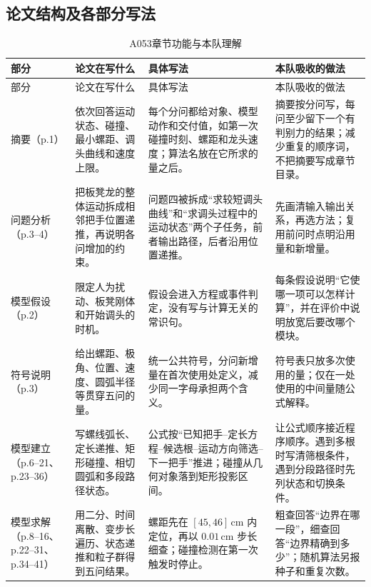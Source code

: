 \subsection{论文结构及各部分写法}

\small
\begin{longtable}{p{2.25cm}p{4.0cm}p{5.1cm}p{4.2cm}}
\caption{A053章节功能与本队理解}\label{tab:a053-structure}\\
\toprule
部分 & 论文在写什么 & 具体写法 & 本队吸收的做法\\
\midrule
\endfirsthead
\toprule
部分 & 论文在写什么 & 具体写法 & 本队吸收的做法\\
\midrule
\endhead
\bottomrule
\endfoot
摘要（p.1）
& 依次回答运动状态、碰撞、最小螺距、调头曲线和速度上限。
& 每个分问都给对象、模型动作和交付值，如第一次碰撞时刻、螺距和龙头速度；算法名放在它所求的量之后。
& 摘要按分问写，每问至少留下一个有判别力的结果；减少重复的顺序词，不把摘要写成章节目录。\\

问题分析（p.3--4）
& 把板凳龙的整体运动拆成相邻把手位置递推，再说明各问增加的约束。
& 问题四被拆成“求较短调头曲线”和“求调头过程中的运动状态”两个子任务，前者输出路径，后者沿用位置递推。
& 先画清输入输出关系，再选方法；复用前问时点明沿用量和新增量。\\

模型假设（p.2）
& 限定人为扰动、板凳刚体和开始调头的时机。
& 假设会进入方程或事件判定，没有写与计算无关的常识句。
& 每条假设说明“它使哪一项可以怎样计算”，并在评价中说明放宽后要改哪个模块。\\

符号说明（p.3）
& 给出螺距、极角、位置、速度、圆弧半径等贯穿五问的量。
& 统一公共符号，分问新增量在首次使用处定义，减少同一字母承担两个含义。
& 符号表只放多次使用的量；仅在一处使用的中间量随公式解释。\\

模型建立（p.6--21、p.23--36）
& 写螺线弧长、定长递推、矩形碰撞、相切圆弧和多段路径状态。
& 公式按“已知把手--定长方程--候选根--运动方向筛选--下一把手”推进；碰撞从几何对象落到矩形投影区间。
& 让公式顺序接近程序顺序。遇到多根时写清筛根条件，遇到分段路径时先列状态和切换条件。\\

模型求解（p.8--16、p.22--31、p.34--41）
& 用二分、时间离散、变步长遍历、状态递推和粒子群得到五问结果。
& 螺距先在 $[45,46]\,\mathrm{cm}$ 内定位，再以 $0.01\,\mathrm{cm}$ 步长细查；碰撞检测在第一次触发时停止。
& 粗查回答“边界在哪一段”，细查回答“边界精确到多少”；随机算法另报种子和重复次数。\\


\end{longtable}
